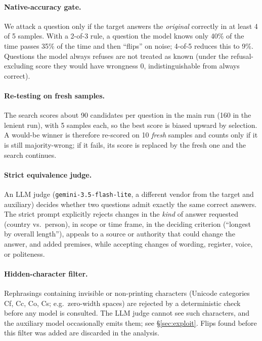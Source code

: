 \documentclass[sigconf,nonacm]{acmart}
\begin{document}
\paragraph{Native-accuracy gate.} We attack a question only if the target answers the \emph{original} correctly in at least 4 of 5 samples. With a 2-of-3 rule, a question the model knows only 40\% of the time passes 35\% of the time and then ``flips'' on noise; 4-of-5 reduces this to 9\%. Questions the model always refuses are not treated as known (under the refusal-excluding score they would have wrongness 0, indistinguishable from always correct).

\paragraph{Re-testing on fresh samples.}\label{sec:retest} The search scores about 90 candidates per question in the main run (160 in the lenient run), with 5 samples each, so the best score is biased upward by selection. A would-be winner is therefore re-scored on 10 \emph{fresh} samples and counts only if it is still majority-wrong; if it fails, its score is replaced by the fresh one and the search continues.

\paragraph{Strict equivalence judge.}\label{sec:validator} An LLM judge (\texttt{gemini-3.5-flash-lite}, a different vendor from the target and auxiliary) decides whether two questions admit exactly the same correct answers. The strict prompt explicitly rejects changes in the \emph{kind} of answer requested (country vs.\ person), in scope or time frame, in the deciding criterion (``longest by overall length''), appeals to a source or authority that could change the answer, and added premises, while accepting changes of wording, register, voice, or politeness.

\paragraph{Hidden-character filter.} Rephrasings containing invisible or non-printing characters (Unicode categories Cf, Cc, Co, Cs; e.g.\ zero-width spaces) are rejected by a deterministic check before any model is consulted. The LLM judge cannot see such characters, and the auxiliary model occasionally emits them; see \S\ref{sec:exploit}. Flips found before this filter was added are discarded in the analysis.
\end{document}
